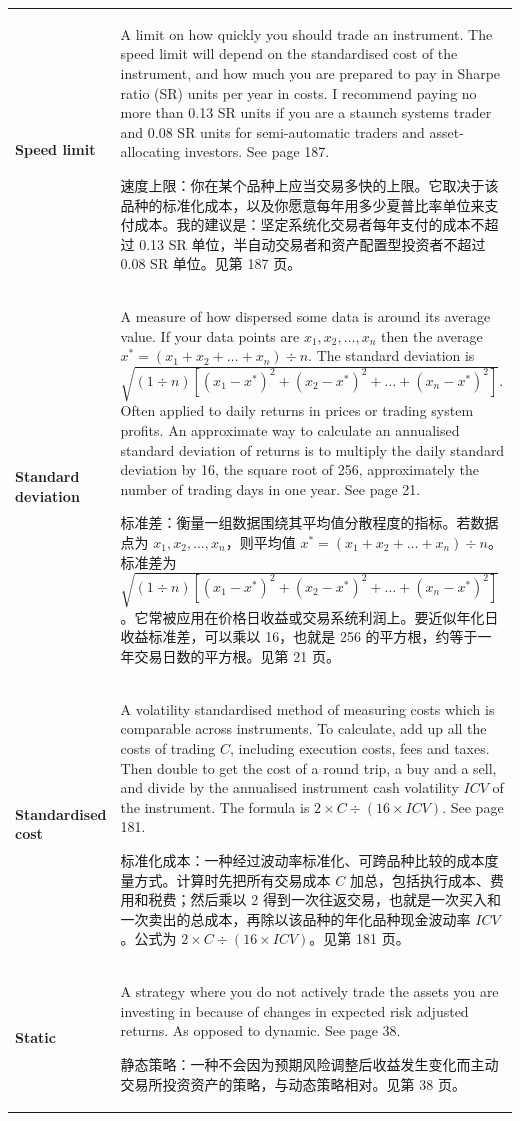 \begin{chinesetableblock}
{\begin{longtable}{@{}>{\raggedright\arraybackslash\bfseries} p{}>{\raggedright\arraybackslash} p{}@{}}
Speed limit & A limit on how quickly you should trade an instrument. The speed limit will depend on the standardised cost of the instrument, and how much you are prepared to pay in Sharpe ratio (SR) units per year in costs. I recommend paying no more than 0.13 SR units if you are a staunch systems trader and 0.08 SR units for semi-automatic traders and asset-allocating investors. See page 187. \par 速度上限：你在某个品种上应当交易多快的上限。它取决于该品种的标准化成本，以及你愿意每年用多少夏普比率单位来支付成本。我的建议是：坚定系统化交易者每年支付的成本不超过 0.13 SR 单位，半自动交易者和资产配置型投资者不超过 0.08 SR 单位。见第 187 页。 \\[0.65em]
Standard deviation & A measure of how dispersed some data is around its average value. If your data points are \(x_1, x_2, \ldots, x_n\) then the average \(x^* = (x_1 + x_2 + \ldots + x_n) \div n\). The standard deviation is \(\sqrt{(1 \div n)[(x_1 - x^*)^2 + (x_2 - x^*)^2 + \ldots + (x_n - x^*)^2]}\). Often applied to daily returns in prices or trading system profits. An approximate way to calculate an annualised standard deviation of returns is to multiply the daily standard deviation by 16, the square root of 256, approximately the number of trading days in one year. See page 21. \par 标准差：衡量一组数据围绕其平均值分散程度的指标。若数据点为 \(x_1, x_2, \ldots, x_n\)，则平均值 \(x^* = (x_1 + x_2 + \ldots + x_n) \div n\)。标准差为 \(\sqrt{(1 \div n)[(x_1 - x^*)^2 + (x_2 - x^*)^2 + \ldots + (x_n - x^*)^2]}\)。它常被应用在价格日收益或交易系统利润上。要近似年化日收益标准差，可以乘以 16，也就是 256 的平方根，约等于一年交易日数的平方根。见第 21 页。 \\[0.65em]
Standardised cost & A volatility standardised method of measuring costs which is comparable across instruments. To calculate, add up all the costs of trading \(C\), including execution costs, fees and taxes. Then double to get the cost of a round trip, a buy and a sell, and divide by the annualised instrument cash volatility \(ICV\) of the instrument. The formula is \(2 \times C \div (16 \times ICV)\). See page 181. \par 标准化成本：一种经过波动率标准化、可跨品种比较的成本度量方式。计算时先把所有交易成本 \(C\) 加总，包括执行成本、费用和税费；然后乘以 2 得到一次往返交易，也就是一次买入和一次卖出的总成本，再除以该品种的年化品种现金波动率 \(ICV\)。公式为 \(2 \times C \div (16 \times ICV)\)。见第 181 页。 \\[0.65em]
Static & A strategy where you do not actively trade the assets you are investing in because of changes in expected risk adjusted returns. As opposed to dynamic. See page 38. \par 静态策略：一种不会因为预期风险调整后收益发生变化而主动交易所投资资产的策略，与动态策略相对。见第 38 页。 \\[0.65em]

\end{longtable}}
\end{chinesetableblock}
